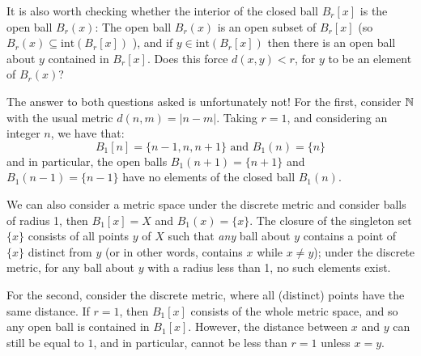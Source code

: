 It is also worth checking whether the interior of the closed ball $B_{r}[x]$ is the open ball $B_{r}(x)$: The open ball $B_{r}(x)$ is an open subset of $B_{r}[x]$ (so $B_{r}(x) \subseteq \text{int}(B_{r}[x])$ ), and if $y\in \text{int}(B_{r}[x])$ then there is an open ball about $y$ contained in $B_{r}[x]$. Does this force $d(x,y) < r$, for $y$ to be an element of $B_{r}(x)$?

The answer to both questions asked is unfortunately not! 
For the first, consider $\mathbb{N}$ with the usual metric $d(n,m) = |n - m|$. Taking $r=1$, and considering an integer $n$, we have that: \[ B_{1}[n] = \{n-1, n, n+1 \} \text{ and } B_{1}(n) = \{n\} \] and in particular, the open balls $B_{1}(n+1) = \{ n+1 \}$ and $B_{1}(n-1) = \{ n-1 \} $ have no elements of the closed ball $B_{1}(n)$. 

We can also consider a metric space under the discrete metric and consider balls of radius 1, then $B_{1}[x] = X$ and $B_{1}(x) = \{x\}$. The closure of the singleton set $\{x\}$ consists of all points $y$ of $X$ such that \emph{any} ball about $y$ contains a point of $\{ x \}$ distinct from $y$ (or in other words, contains $x$ while $x\neq y$); under the discrete metric, for any ball about $y$ with a radius less than 1, no such elements exist.

For the second, consider the discrete metric, where all (distinct) points have the same distance. If $r = 1$, then $B_{1}[x]$ consists of the whole metric space, and so any open ball is contained in $B_{1}[x]$. However, the distance between $x$ and $y$ can still be equal to $1$, and in particular, cannot be less than $r=1$ unless $x=y$.

